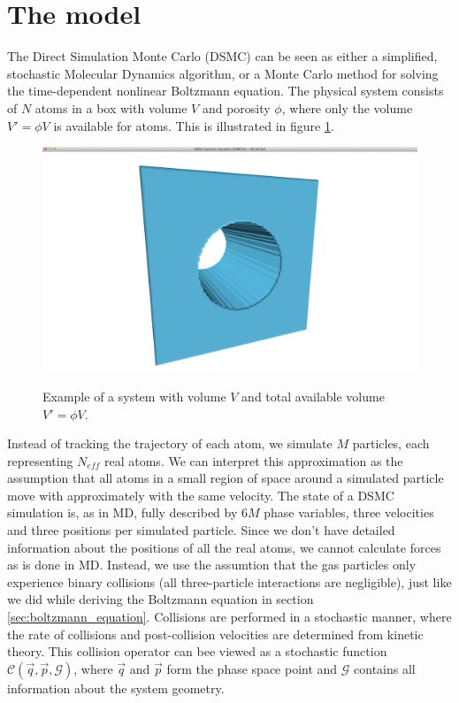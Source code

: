 \section{The model}
\label{sec:dsmc_model}
The Direct Simulation Monte Carlo (DSMC) can be seen as either a simplified, stochastic Molecular Dynamics algorithm, or a Monte Carlo method for solving the time-dependent nonlinear Boltzmann equation. The physical system consists of $N$ atoms in a box with volume $V$ and porosity $\phi$, where only the volume $V' = \phi V$ is available for atoms. This is illustrated in figure \ref{fig:cylinder}.
\begin{figure}[h]
\begin{center}
\includegraphics[width=\textwidth, trim=0cm 0cm 0cm 0cm, clip]{DSMC/figures/cylinder.png}
\label{fig:cylinder}
\end{center}
\caption{Example of a system with volume $V$ and total available volume $V' = \phi V$.}
\end{figure}
Instead of tracking the trajectory of each atom, we simulate $M$ particles, each representing $N_{eff}$ real atoms. We can interpret this approximation as the assumption that all atoms in a small region of space around a simulated particle move with approximately with the same velocity. The state of a DSMC simulation is, as in MD, fully described by $6M$ phase variables, three velocities and three positions per simulated particle. Since we don't have detailed information about the positions of all the real atoms, we cannot calculate forces as is done in MD. Instead, we use the assumtion that the gas particles only experience binary collisions (all three-particle interactions are negligible), just like we did while deriving the Boltzmann equation in section \ref{sec:boltzmann_equation}. Collisions are performed in a stochastic manner, where the rate of collisions and post-collision velocities are determined from kinetic theory. This collision operator can bee viewed as a stochastic function $\mathcal{C}(\vec q, \vec p, \mathcal{G})$, where $\vec q$ and $\vec p$ form the phase space point and $\mathcal G$ contains all information about the system geometry.\\
